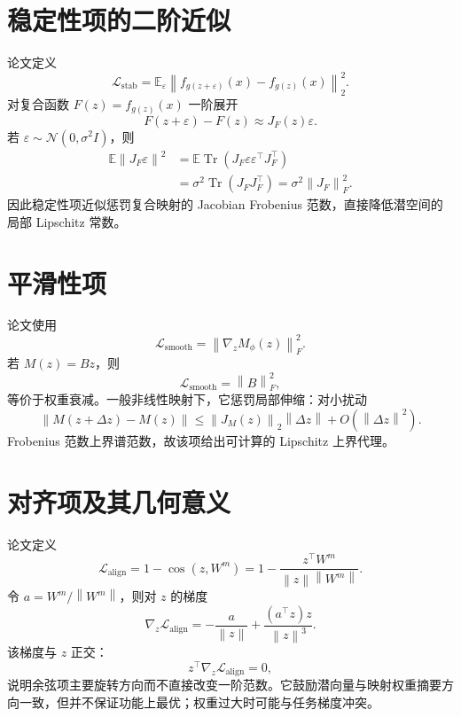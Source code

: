 \documentclass[UTF8,12pt,a4paper,fontset=none]{ctexart}
\numberwithin{equation}{section}
\newcommand{\E}{\mathbb{E}}
\newcommand{\Loss}{\mathcal{L}}
\newcommand{\norm}[1]{\left\lVert #1\right\rVert}
\newcommand{\tr}{\operatorname{Tr}}
\begin{document}
\section{稳定性项的二阶近似}
论文定义
\begin{equation}
 \Loss_{\mathrm{stab}}
 =\E_{\varepsilon}\norm{f_{g(z+\varepsilon)}(x)-f_{g(z)}(x)}_2^2.
\end{equation}
对复合函数 $F(z)=f_{g(z)}(x)$ 一阶展开
\begin{equation}
 F(z+\varepsilon)-F(z)\approx J_F(z)\varepsilon.
\end{equation}
若 $\varepsilon\sim\mathcal N(0,\sigma^2I)$，则
\begin{align}
 \E\norm{J_F\varepsilon}^2
 &=\E\tr(J_F\varepsilon\varepsilon^\top J_F^\top)\\
 &=\sigma^2\tr(J_FJ_F^\top)
 =\sigma^2\norm{J_F}_F^2.
\end{align}
因此稳定性项近似惩罚复合映射的 Jacobian Frobenius 范数，直接降低潜空间的局部 Lipschitz 常数。

\section{平滑性项}
论文使用
\begin{equation}
 \boxed{\Loss_{\mathrm{smooth}}=\norm{\nabla_zM_\phi(z)}_F^2.}
\end{equation}
若 $M(z)=Bz$，则
\begin{equation}
 \Loss_{\mathrm{smooth}}=\norm{B}_F^2,
\end{equation}
等价于权重衰减。一般非线性映射下，它惩罚局部伸缩：对小扰动
\begin{equation}
 \norm{M(z+\Delta z)-M(z)}
 \le\norm{J_M(z)}_2\norm{\Delta z}+O(\norm{\Delta z}^2).
\end{equation}
Frobenius 范数上界谱范数，故该项给出可计算的 Lipschitz 上界代理。

\section{对齐项及其几何意义}
论文定义
\begin{equation}
 \Loss_{\mathrm{align}}
 =1-\cos(z,W^m)
 =1-\frac{z^\top W^m}{\norm z\norm{W^m}}.
\end{equation}
令 $a=W^m/\norm{W^m}$，则对 $z$ 的梯度
\begin{equation}
 \nabla_z\Loss_{\mathrm{align}}
 =-\frac{a}{\norm z}
 +\frac{(a^\top z)z}{\norm z^3}.
\end{equation}
该梯度与 $z$ 正交：
\begin{equation}
 z^\top\nabla_z\Loss_{\mathrm{align}}=0,
\end{equation}
说明余弦项主要旋转方向而不直接改变一阶范数。它鼓励潜向量与映射权重摘要方向一致，但并不保证功能上最优；权重过大时可能与任务梯度冲突。
\end{document}
